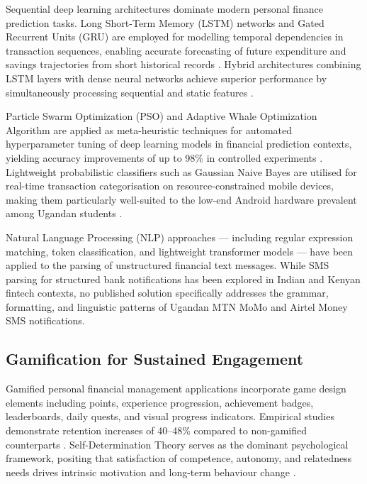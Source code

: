 \documentclass[12pt,a4paper]{report}
\begin{document}
Sequential deep learning architectures dominate modern personal finance prediction
tasks. Long Short-Term Memory (LSTM) networks and Gated Recurrent Units (GRU)
are employed for modelling temporal dependencies in transaction sequences, enabling
accurate forecasting of future expenditure and savings trajectories from short historical
records \citep{Kumar2024}. Hybrid architectures combining LSTM layers with dense
neural networks achieve superior performance by simultaneously processing sequential
and static features \citep{VasanthaKumari2025}.

Particle Swarm Optimization (PSO) and Adaptive Whale Optimization Algorithm are
applied as meta-heuristic techniques for automated hyperparameter tuning of deep
learning models in financial prediction contexts, yielding accuracy improvements of up
to 98\% in controlled experiments \citep{Balakrishnan2025,Elhoseny2022}. Lightweight
probabilistic classifiers such as Gaussian Naive Bayes are utilised for real-time
transaction categorisation on resource-constrained mobile devices, making them
particularly well-suited to the low-end Android hardware prevalent among Ugandan
students \citep{VasanthaKumari2025}.

Natural Language Processing (NLP) approaches --- including regular expression
matching, token classification, and lightweight transformer models --- have been
applied to the parsing of unstructured financial text messages. While SMS parsing for
structured bank notifications has been explored in Indian and Kenyan fintech contexts,
no published solution specifically addresses the grammar, formatting, and linguistic
patterns of Ugandan MTN MoMo and Airtel Money SMS notifications.

\subsection{Gamification for Sustained Engagement}

Gamified personal financial management applications incorporate game design elements
including points, experience progression, achievement badges, leaderboards, daily
quests, and visual progress indicators. Empirical studies demonstrate retention
increases of 40--48\% compared to non-gamified counterparts \citep{Bitrian2021}.
Self-Determination Theory serves as the dominant psychological framework, positing
that satisfaction of competence, autonomy, and relatedness needs drives intrinsic
motivation and long-term behaviour change \citep{Uppaluri2025,Khaldi2023}.
\end{document}
